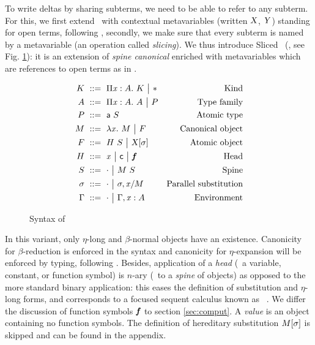 \documentclass{llncs}
\begin{document}
To write deltas by sharing subterms, we need to be able to refer to
any subterm. For this, we first extend \LF\ with contextual
metavariables (written $\text{\textsl{X}}$, $\text{\textsl{Y}}$) standing for open terms,
following \cite{nanevski2008contextual}, secondly, we make sure that
every subterm is named by a metavariable (an operation called
\emph{slicing}). We thus introduce Sliced \LF\ (\SLF, see
Fig. \ref{fig:syntax-LF}): it is an extension of \emph{spine canonical
  \LF} \cite{pfenning2007term} enriched with metavariables which are
references to open terms as in \cite{nanevski2008contextual}.

\begin{figure}[t]
  \begin{align*}
    K &\ ::=\  \Pi{\ensuremath{\text{\textit{x}}}}:{A}.\  K \ {\big|}\  \mathsf{*} &
    \text{Kind}\\
    A &\ ::=\  \Pi{\ensuremath{\text{\textit{x}}}}:{A}.\  A \ {\big|}\  P &
    \text{Type family} \\
    P &\ ::=\  {\text{\textsf{a}}}\  S &
    \text{Atomic type} \\
    M &\ ::=\  \lambda{\ensuremath{\text{\textit{x}}}}.\  M \ {\big|}\  F &
    \text{Canonical object} \\
    F &\ ::=\  {H}\  S \ {\big|}\  {\text{\textsl{X}}}[{\sigma}] &
    \text{Atomic object} \\
    H &\ ::=\  \text{\textit{x}} \ {\big|}\  \text{\textsf{c}} \ {\big|}\  \text{\textit{\textbf{f}}} &
    \text{Head}\\
    S &\ ::=\  \cdot \ {\big|}\  {M}\ {S} &
    \text{Spine}\\
    \sigma &\ ::=\  \cdot \ {\big|}\  {\sigma},{{\text{\textit{x}}}/{M}} &
    \text{Parallel substitution} \\
    \Gamma &\ ::=\  \cdot \ {\big|}\  {\Gamma},{{\text{\textit{x}}}:{A}} &
    \text{Environment}
  \end{align*}
  \caption{Syntax of \SLF}
  \label{fig:syntax-LF}
\end{figure}

In this variant, only $\eta$-long and $\beta$-normal objects have an
existence. Canonicity for $\beta$-reduction is enforced in the syntax
and canonicity for $\eta$-expansion will be enforced by typing,
following \cite{hl07mechanizing}. Besides, application of a
\emph{head} (\ie\ a variable, constant, or function symbol) is $n$-ary
(\ie\ to a \emph{spine} of objects) as opposed to the more standard
binary application: this eases the definition of substitution and
$\eta$-long forms, and corresponds to a focused sequent calculus known
as ~\cite{herbelin1995lambda}. We differ the discussion
of function symbols $\text{\textit{\textbf{f}}}$ to section \ref{sec:comput}. A
\emph{value} is an object containing no function symbols. The
definition of hereditary substitution ${M}[{\sigma}]$ is skipped
and can be found in the appendix.
\end{document}
